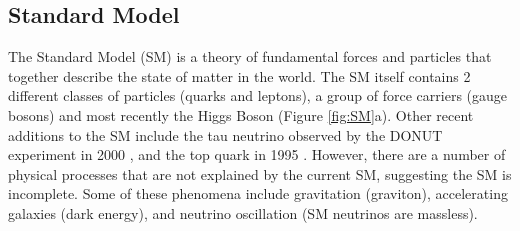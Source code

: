 



\subsection{Standard Model}
The Standard Model (SM) is a theory of fundamental forces and particles that together describe the state of matter in the world. The SM itself contains 2 different classes of particles (quarks and leptons), a group of force carriers (gauge bosons) and most recently the Higgs Boson (Figure \ref{fig:SM}a). Other recent additions to the SM include the tau neutrino observed by the DONUT experiment in 2000 \cite{bib:donut}, and the top quark in 1995 \cite{bib:cdf}. However, there are a number of physical processes that are not explained by the current SM, suggesting the SM is incomplete.  Some of these phenomena include gravitation (graviton), accelerating galaxies (dark energy), and neutrino oscillation (SM neutrinos are massless). 

